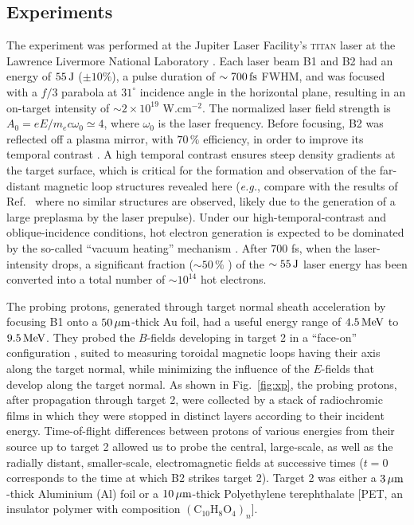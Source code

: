\documentclass[aps,twocolumn,showpacs,superscriptaddress]{revtex4}
\begin{document}
\subsection*{Experiments}
The experiment 
was performed at the Jupiter Laser Facility's \textsc{titan} laser at the Lawrence Livermore National Laboratory \cite{RSI_Albertazzi_2015}. Each laser beam B1 and B2 had an energy of $55\,\rm J$ ($\pm 10\%$), a pulse duration of $\sim 700\,\rm fs$ FWHM, and was focused with a $f/3$ parabola at $31^\circ$ incidence angle in the horizontal plane, resulting in an on-target intensity of $\sim 2\times 10^{19}$ W.cm$^{-2}$. The normalized laser field strength is $A_0 = eE/m_ec\omega_0 \simeq 4$, where $\omega_0$ is the laser frequency. Before focusing, B2 was reflected off a plasma mirror, with $70\,\%$ efficiency, in order to improve its temporal contrast \cite{PRE_Doumy_2004}. A high temporal contrast ensures steep density gradients at the target surface, which is critical for the formation and observation of the far-distant magnetic loop structures revealed here (\emph{e.g.}, compare with the results of Ref.~\cite{PRL_Sarri_2012} where no similar structures are observed, likely due to the generation of a large preplasma by the laser prepulse). Under our high-temporal-contrast and oblique-incidence conditions, hot electron generation is expected to be dominated by the so-called ``vacuum heating'' mechanism \cite{PRE_May_2011}. After $700$ fs, when the laser-intensity drops, a significant fraction ($\sim 50\,\%$ \cite{PRL_Ping_2008}) of the $\sim 55\,\rm J$ laser energy has been converted into a total number of $\sim 10^{14}$ hot electrons.

The probing protons, generated through target normal sheath acceleration \cite{PRL_Fuchs_2003} by focusing B1 onto a $50\,\rm \mu m$-thick Au foil, had a useful energy range of $4.5\,\rm MeV$ to $9.5\,\rm MeV$. They probed the $B$-fields developing in target 2 in a ``face-on'' configuration \cite{RSI_Albertazzi_2015}, suited to measuring toroidal magnetic loops having their axis along the target normal, while minimizing the influence of the $E$-fields that develop along the target normal. As shown in Fig.~\ref{fig:xp}, the probing protons, after propagation through target 2, were collected by a stack of radiochromic films \cite[]{RSI_Chen_2016} in which they were stopped in distinct layers according to their incident energy. Time-of-flight differences between protons of various energies from their source up to target 2 allowed us to probe the central, large-scale, as well as the radially distant, smaller-scale, electromagnetic fields at successive times ($t=0$ corresponds to the time at which B2 strikes target 2). Target 2 was either a $3\,\rm \mu m$-thick Aluminium (Al) foil or a $10\,\rm \mu m$-thick Polyethylene terephthalate [PET, an insulator polymer with composition $(\mathrm{C}_{10}\mathrm{H}_8\mathrm{O}_4)_n$].
 
\end{document}

